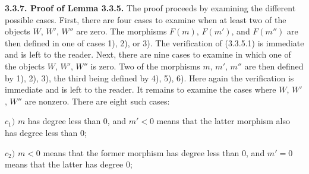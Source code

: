 \medskip\noindent\textbf{3.3.7. Proof of Lemma 3.3.5.}\quad
The proof proceeds by examining the different possible cases. First, there
are four cases to examine when at least two of the objects $W$, $W'$, $W''$
are zero. The morphisms $F(m)$, $F(m')$, and $F(m'')$ are then defined in
one of cases 1), 2), or 3). The verification of (3.3.5.1) is immediate and
is left to the reader. Next, there are nine cases to examine in which one of
the objects $W$, $W'$, $W''$ is zero. Two of the morphisms $m$, $m'$, $m''$
are then defined by 1), 2), 3), the third being defined by 4), 5), 6). Here
again the verification is immediate and is left to the reader. It remains
to examine the cases where $W$, $W'$, $W''$ are nonzero. There are eight
such cases:

\noindent$c_1)$ $m$ has degree less than 0, and $m'<0$ means that the latter morphism also has degree less than 0;

\noindent$c_2)$ $m<0$ means that the former morphism has degree less than 0, and $m'=0$ means that the latter has degree 0;
\endgroup
